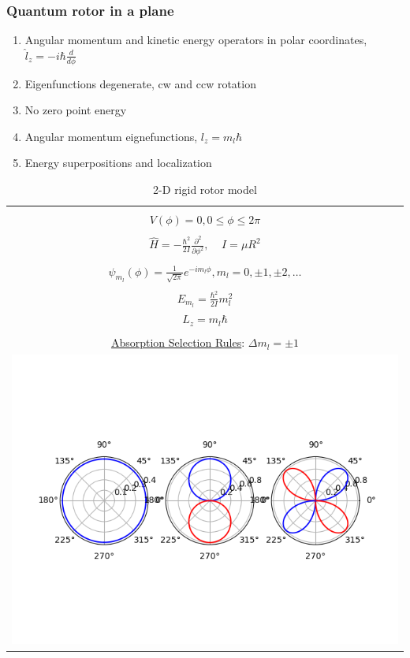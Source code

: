 \documentclass[11pt]{article}
\begin{document}
\subsubsection{Quantum rotor in a plane}
\label{sec:org69bdd71}
\begin{enumerate}
\item Angular momentum and kinetic energy operators in polar coordinates,
\(\hat l_z = -i\hbar \frac{d}{d\phi}\)
\item Eigenfunctions degenerate, cw and ccw rotation
\item No zero point energy
\item Angular momentum eignefunctions, \(l_z = m_l \hbar\)
\item Energy superpositions and localization
\end{enumerate}

\begin{table}[H]
   \begin{center}
   \caption{2-D rigid rotor model}
    \label{Rigid rotor}
\begin{tabular}[H]{|c|}
\hline
 \\
$\displaystyle       V(\phi) = 0, 0 \leq \phi \leq 2\pi $ \\
 \\
$\displaystyle \hat H = -\frac{\hbar^2}{2 I} \frac{\partial^2}{\partial
  \phi^2},\ \ \ \ \ I=\mu R^2
$\\
\\
$\displaystyle     \psi_{m_l}(\phi) = \frac{1}{\sqrt{2\pi}} e^{-i m_l \phi}, m_l
= 0, \pm 1, \pm 2, \ldots $ \\
\\
$\displaystyle     E_{m_l}=\frac{\hbar^2}{2 I}m_l^2$ 
 \\
$\displaystyle L_z = m_l \hbar$ \\
\\ \underline{Absorption Selection Rules}: 
$\displaystyle \Delta m_l = \pm 1$
\\
     \includegraphics[scale=0.8]{Images/2Drotor.png} \\       
\hline
\end{tabular}
 \end{center}
\end{table}
\end{document}
